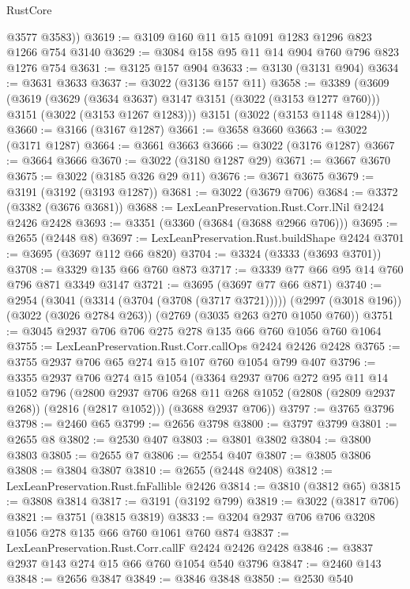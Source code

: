 \begin{lexlean}{RustCore}
\begin{coremodule}
        @3577
        @3583))
@3619 := @3109 @160 @11 @15 @1091 @1283 @1296 @823 @1266 @754 @3140
@3629 := @3084 @158 @95 @11 @14 @904 @760 @796 @823 @1276 @754
@3631 := @3125 @157 @904
@3633 := @3130 (@3131 @904)
@3634 := @3631 @3633
@3637 := @3022 (@3136 @157 @11)
@3658 := @3389
    (@3609
      (@3619
        (@3629 (@3634 @3637) @3147 @3151 (@3022 (@3153 @1277 @760)))
        @3151
        (@3022 (@3153 @1267 @1283)))
      @3151
      (@3022 (@3153 @1148 @1284)))
@3660 := @3166 (@3167 @1287)
@3661 := @3658 @3660
@3663 := @3022 (@3171 @1287)
@3664 := @3661 @3663
@3666 := @3022 (@3176 @1287)
@3667 := @3664 @3666
@3670 := @3022 (@3180 @1287 @29)
@3671 := @3667 @3670
@3675 := @3022 (@3185 @326 @29 @11)
@3676 := @3671 @3675
@3679 := @3191 (@3192 (@3193 @1287))
@3681 := @3022 (@3679 @706)
@3684 := @3372 (@3382 (@3676 @3681))
@3688 := LexLeanPreservation.Rust.Corr.lNil @2424 @2426 @2428
@3693 := @3351 (@3360 (@3684 (@3688 @2966 @706)))
@3695 := @2655 (@2448 @8)
@3697 := LexLeanPreservation.Rust.buildShape @2424
@3701 := @3695 (@3697 @112 @66 @820)
@3704 := @3324 (@3333 (@3693 @3701))
@3708 := @3329 @135 @66 @760 @873
@3717 := @3339 @77 @66 @95 @14 @760 @796 @871 @3349 @3147
@3721 := @3695 (@3697 @77 @66 @871)
@3740 := @2954
    (@3041 (@3314 (@3704 (@3708 (@3717 @3721)))))
    (@2997 (@3018 @196))
    (@3022 (@3026 @2784 @263))
    (@2769 (@3035 @263 @270 @1050 @760))
@3751 := @3045 @2937 @706 @706 @275 @278 @135 @66 @760 @1056 @760 @1064
@3755 := LexLeanPreservation.Rust.Corr.callOps @2424 @2426 @2428
@3765 := @3755 @2937 @706 @65 @274 @15 @107 @760 @1054 @799 @407
@3796 := @3355
    @2937
    @706
    @274
    @15
    @1054
    (@3364
      @2937
      @706
      @272
      @95
      @11
      @14
      @1052
      @796
      (@2800 @2937 @706 @268 @11 @268 @1052 (@2808 (@2809 @2937 @268)) (@2816 (@2817 @1052)))
      (@3688 @2937 @706))
@3797 := @3765 @3796
@3798 := @2460 @65
@3799 := @2656 @3798
@3800 := @3797 @3799
@3801 := @2655 @8
@3802 := @2530 @407
@3803 := @3801 @3802
@3804 := @3800 @3803
@3805 := @2655 @7
@3806 := @2554 @407
@3807 := @3805 @3806
@3808 := @3804 @3807
@3810 := @2655 (@2448 @2408)
@3812 := LexLeanPreservation.Rust.fnFallible @2426
@3814 := @3810 (@3812 @65)
@3815 := @3808 @3814
@3817 := @3191 (@3192 @799)
@3819 := @3022 (@3817 @706)
@3821 := @3751 (@3815 @3819)
@3833 := @3204 @2937 @706 @706 @3208 @1056 @278 @135 @66 @760 @1061 @760 @874
@3837 := LexLeanPreservation.Rust.Corr.callF @2424 @2426 @2428
@3846 := @3837 @2937 @143 @274 @15 @66 @760 @1054 @540 @3796
@3847 := @2460 @143
@3848 := @2656 @3847
@3849 := @3846 @3848
@3850 := @2530 @540

\end{coremodule}
\end{lexlean}
